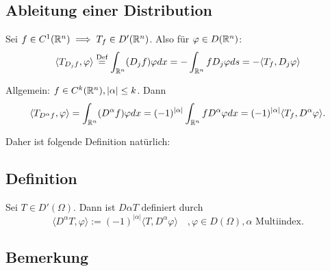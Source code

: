 \subsection{Ableitung einer Distribution}

Sei $f \in C^1(\mathbb{R}^n) \implies T_f \in D'(\mathbb{R}^n)$. Also für $\varphi \in D(\mathbb{R}^n)$:
$$
\langle T_{D_j f}, \varphi \rangle \overset{\text{Def}}{=} \int_{\mathbb{R}^n}(D_j f) \varphi dx = - \int_{\mathbb{R}^n} f D_j \varphi ds = - \langle T_f, D_j \varphi  \rangle
$$

Allgemein: $f \in C^k(\mathbb{R}^n), |\alpha| \leq k$. Dann
$$
\langle T_{D^\alpha f}, \varphi \rangle = \int_{\mathbb{R}^n} (D^\alpha f) \varphi dx = (-1)^{|\alpha|} \int_{\mathbb{R}^n} f D^\alpha \varphi dx = (-1)^{|\alpha|} \langle T_f, D^\alpha \varphi \rangle.
$$

Daher ist folgende Definition natürlich:

\subsection{Definition}

Sei $T \in D'(\Omega)$. Dann ist $D\alpha T$ definiert durch
$$
\langle D^\alpha T, \varphi\rangle := (-1)^{|\alpha|} \langle T, D^\alpha \varphi \rangle \quad, \varphi \in D(\Omega), \alpha \text{ Multiindex}.
$$

\subsection{Bemerkung}

